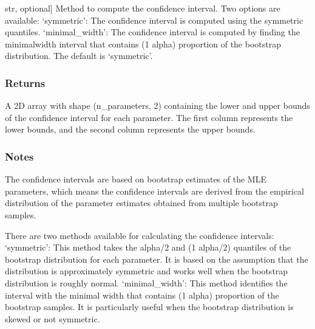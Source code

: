\documentclass[a4paper,11pt,openany,english]{sphinxmanual}
\begin{document}
\begin{fulllineitems}
\begin{fulllineitems}
\begin{description}
\sphinxlineitem{method}{[}str, optional{]}
\sphinxAtStartPar
Method to compute the confidence interval. Two options are available:
\sphinxhyphen{} ‘symmetric’: The confidence interval is computed using the symmetric quantiles.
\sphinxhyphen{} ‘minimal\_width’: The confidence interval is computed by finding the minimal\sphinxhyphen{}width 
interval that contains (1 \sphinxhyphen{} alpha) proportion of the bootstrap distribution.
The default is ‘symmetric’.

\end{description}


\subsubsection{Returns}
\label{\detokenize{api_bootstrap:returns}}\begin{description}
\sphinxAtStartPar
A 2D array with shape (n\_parameters, 2) containing the lower and upper bounds of 
the confidence interval for each parameter. The first column represents the lower 
bounds, and the second column represents the upper bounds.

\end{description}


\subsubsection{Notes}
\label{\detokenize{api_bootstrap:notes}}
\sphinxAtStartPar
The confidence intervals are based on bootstrap estimates of the MLE parameters, which 
means the confidence intervals are derived from the empirical distribution of the parameter 
estimates obtained from multiple bootstrap samples.

\sphinxAtStartPar
There are two methods available for calculating the confidence intervals:
\sphinxhyphen{} ‘symmetric’: This method takes the alpha/2 and (1 \sphinxhyphen{} alpha/2) quantiles of the bootstrap 
distribution for each parameter. It is based on the assumption that the distribution 
is approximately symmetric and works well when the bootstrap distribution is roughly normal.
\sphinxhyphen{} ‘minimal\_width’: This method identifies the interval with the minimal width that contains 
(1 \sphinxhyphen{} alpha) proportion of the bootstrap samples. It is particularly useful when the 
bootstrap distribution is skewed or not symmetric.

\end{fulllineitems}


\end{fulllineitems}
\end{document}
